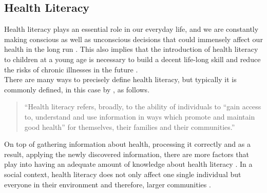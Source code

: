 \subsection{Health Literacy}
\label{subsection:HealthLiteracy}
Health literacy plays an essential role in our everyday life, and we are constantly making conscious as well as unconscious decisions that could immensely affect our health in the long run \autocite{manganello2007health, paakkari2012health, velardo2017emphasizing}. This also implies that the introduction of health literacy to children at a young age is necessary to build a decent life-long skill and reduce the risks of chronic illnesses in the future \autocite{velardo2017emphasizing, jordan2015gesundheitskompetenz}.\\
There are many ways to precisely define health literacy, but typically it is commonly defined, in this case by \textcite{who2019health}, as follows.
\begin{quote}
``Health literacy refers, broadly, to the ability of individuals to “gain access to, understand and use information in ways which promote and maintain good health” for themselves, their families and their communities.''
\autocite[]{who2019health}
\end{quote}
On top of gathering information about health, processing it correctly and as a result, applying the newly discovered information, there are more factors that play into having an adequate amount of knowledge about health literacy \autocite{paakkari2012health, who2019health}. In a social context, health literacy does not only affect one single individual but everyone in their environment and therefore, larger communities \autocite{velardo2017emphasizing}.

